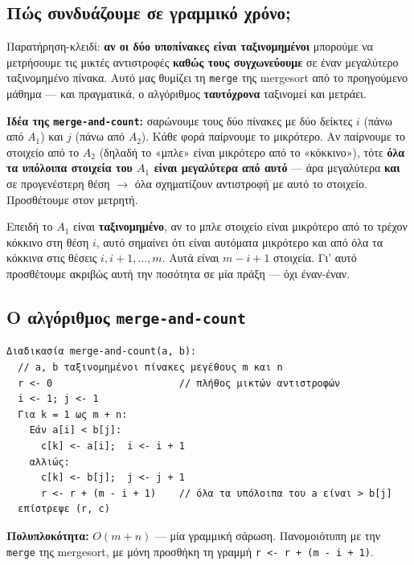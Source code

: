 \documentclass[11pt,a4paper]{article}
\begin{document}
\subsection{Πώς συνδυάζουμε σε γραμμικό χρόνο;}

Παρατήρηση-κλειδί: \textbf{αν οι δύο υποπίνακες είναι ταξινομημένοι} μπορούμε να
μετρήσουμε τις μικτές αντιστροφές \textbf{καθώς τους συγχωνεύουμε} σε έναν
μεγαλύτερο ταξινομημένο πίνακα. Αυτό μας θυμίζει τη \texttt{merge} της mergesort
από το προηγούμενο μάθημα --- και πραγματικά, ο αλγόριθμος \textbf{ταυτόχρονα}
ταξινομεί και μετράει.

\textbf{Ιδέα της \texttt{merge-and-count}:} σαρώνουμε τους δύο πίνακες με δύο
δείκτες $i$ (πάνω από $A_1$) και $j$ (πάνω από $A_2$). Κάθε φορά παίρνουμε το
μικρότερο. Αν παίρνουμε το στοιχείο από το $A_2$ (δηλαδή το «μπλε» είναι
μικρότερο από το «κόκκινο»), τότε \textbf{όλα τα υπόλοιπα στοιχεία του $A_1$ είναι
μεγαλύτερα από αυτό} --- άρα μεγαλύτερα \textbf{και} σε προγενέστερη θέση $\to$
όλα σχηματίζουν αντιστροφή με αυτό το στοιχείο. Προσθέτουμε στον μετρητή.

\begin{keypoint}
Επειδή το $A_1$ είναι \textbf{ταξινομημένο}, αν το μπλε στοιχείο είναι μικρότερο
από το τρέχον κόκκινο στη θέση $i$, αυτό σημαίνει ότι είναι αυτόματα μικρότερο
και από όλα τα κόκκινα στις θέσεις $i, i+1, \dots, m$. Αυτά είναι $m - i + 1$
στοιχεία. Γι' αυτό προσθέτουμε ακριβώς αυτή την ποσότητα σε μία πράξη --- όχι
έναν-έναν.
\end{keypoint}

\subsection{Ο αλγόριθμος \texttt{merge-and-count}}

\begin{codebox}
\begin{verbatim}
Διαδικασία merge-and-count(a, b):
  // a, b ταξινομημένοι πίνακες μεγέθους m και n
  r <- 0                      // πλήθος μικτών αντιστροφών
  i <- 1; j <- 1
  Για k = 1 ως m + n:
    Εάν a[i] < b[j]:
      c[k] <- a[i];  i <- i + 1
    αλλιώς:
      c[k] <- b[j];  j <- j + 1
      r <- r + (m - i + 1)    // όλα τα υπόλοιπα του a είναι > b[j]
  επίστρεψε (r, c)
\end{verbatim}
\end{codebox}
\textbf{Πολυπλοκότητα:} $O(m + n)$ --- μία γραμμική σάρωση. Πανομοιότυπη με την
\texttt{merge} της mergesort, με μόνη προσθήκη τη γραμμή
\texttt{r <- r + (m - i + 1)}.
\end{document}
